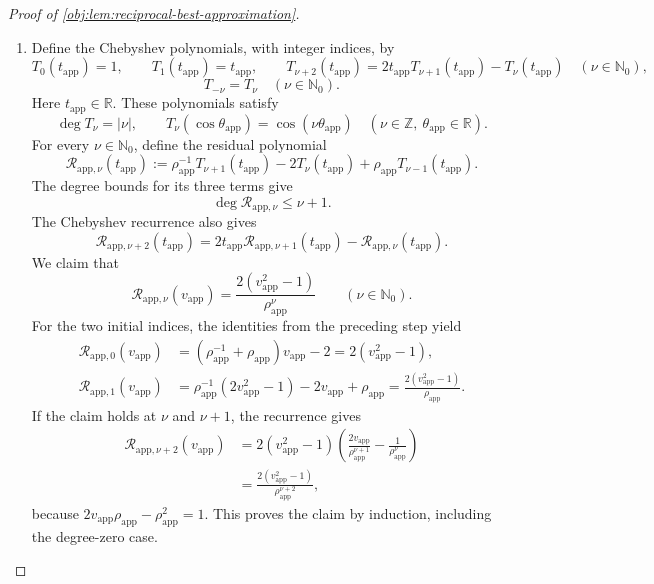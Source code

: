 \documentclass[11pt]{article}
\begin{document}
\begin{proof}[Proof of \cref{obj:lem:reciprocal-best-approximation}]
\begin{enumerate}
\item Define the Chebyshev polynomials, with integer indices, by
\[
T_0(t_{\mathrm{app}})=1,\qquad
T_1(t_{\mathrm{app}})=t_{\mathrm{app}},\qquad
T_{\nu+2}(t_{\mathrm{app}})
=2t_{\mathrm{app}}T_{\nu+1}(t_{\mathrm{app}})
-T_\nu(t_{\mathrm{app}})
\quad(\nu\in\mathbb N_0),
\]
\[
T_{-\nu}=T_\nu\quad(\nu\in\mathbb N_0).
\]
Here \(t_{\mathrm{app}}\in\mathbb R\). These polynomials satisfy
\[
\deg T_\nu=|\nu|,
\qquad
T_\nu(\cos\theta_{\mathrm{app}})
=\cos(\nu\theta_{\mathrm{app}})
\quad(\nu\in\mathbb Z,\ \theta_{\mathrm{app}}\in\mathbb R).
\]
For every \(\nu\in\mathbb N_0\), define the residual polynomial
\[
\mathcal R_{\mathrm{app},\nu}(t_{\mathrm{app}})
:=
\rho_{\mathrm{app}}^{-1}T_{\nu+1}(t_{\mathrm{app}})
-2T_\nu(t_{\mathrm{app}})
+\rho_{\mathrm{app}}T_{\nu-1}(t_{\mathrm{app}}).
\]
The degree bounds for its three terms give
\[
\deg\mathcal R_{\mathrm{app},\nu}\le \nu+1.
\]
The Chebyshev recurrence also gives
\[
\mathcal R_{\mathrm{app},\nu+2}(t_{\mathrm{app}})
=
2t_{\mathrm{app}}\mathcal R_{\mathrm{app},\nu+1}(t_{\mathrm{app}})
-\mathcal R_{\mathrm{app},\nu}(t_{\mathrm{app}}).
\]
We claim that
\[
\mathcal R_{\mathrm{app},\nu}(v_{\mathrm{app}})
=
\frac{2(v_{\mathrm{app}}^2-1)}
{\rho_{\mathrm{app}}^\nu}
\qquad(\nu\in\mathbb N_0).
\]
For the two initial indices, the identities from the preceding step yield
\[
\begin{aligned}
\mathcal R_{\mathrm{app},0}(v_{\mathrm{app}})
&=(\rho_{\mathrm{app}}^{-1}+\rho_{\mathrm{app}})
v_{\mathrm{app}}-2
=2(v_{\mathrm{app}}^2-1),\\
\mathcal R_{\mathrm{app},1}(v_{\mathrm{app}})
&=\rho_{\mathrm{app}}^{-1}(2v_{\mathrm{app}}^2-1)
-2v_{\mathrm{app}}+\rho_{\mathrm{app}}
=\frac{2(v_{\mathrm{app}}^2-1)}{\rho_{\mathrm{app}}}.
\end{aligned}
\]
If the claim holds at \(\nu\) and \(\nu+1\), the recurrence gives
\[
\begin{aligned}
\mathcal R_{\mathrm{app},\nu+2}(v_{\mathrm{app}})
&=
2(v_{\mathrm{app}}^2-1)
\left(
\frac{2v_{\mathrm{app}}}{\rho_{\mathrm{app}}^{\nu+1}}
-\frac{1}{\rho_{\mathrm{app}}^\nu}
\right)\\
&=
\frac{2(v_{\mathrm{app}}^2-1)}
{\rho_{\mathrm{app}}^{\nu+2}},
\end{aligned}
\]
because \(2v_{\mathrm{app}}\rho_{\mathrm{app}}
-\rho_{\mathrm{app}}^2=1\). This proves the claim by induction, including the degree-zero case.


\end{enumerate}
\end{proof}
\end{document}
